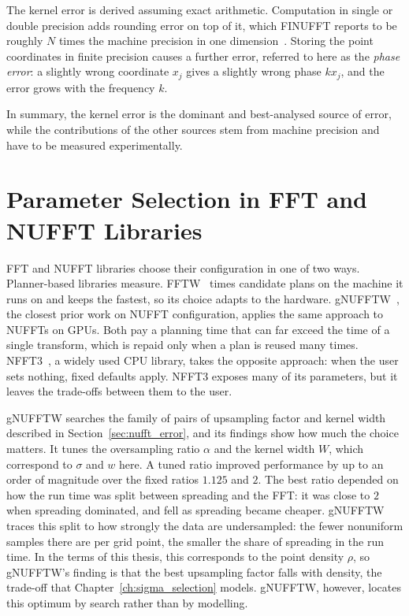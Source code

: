 The kernel error is derived assuming exact arithmetic. Computation in single or
double precision adds rounding error on top of it, which FINUFFT reports to be
roughly $N$ times the machine precision in one
dimension~\cite[Remark~9]{barnett2019}. Storing the point coordinates in
finite precision causes a further error, referred to here as the \emph{phase
error}: a slightly wrong coordinate $x_j$ gives a slightly wrong phase
$k x_j$, and the error grows with the frequency $k$.

In summary, the kernel error is the dominant and best-analysed source of
error, while the contributions of the other sources stem from machine
precision and have to be measured experimentally.

\section{Parameter Selection in FFT and NUFFT Libraries}
\label{sec:related_tuning}

FFT and NUFFT libraries choose their configuration in one of two ways. Planner-based libraries measure. FFTW~\cite{frigo2005} times candidate plans on the machine it runs on and keeps the fastest, so its choice adapts to the hardware. gNUFFTW~\cite{ou2017}, the closest prior work on NUFFT configuration, applies the same approach to NUFFTs on GPUs. Both pay a planning time that can far exceed the time of a single transform, which is repaid only when a plan is reused many times. NFFT3~\cite{keiner2009}, a widely used CPU library, takes the opposite approach: when the user sets nothing, fixed defaults apply. NFFT3 exposes many of its parameters, but it leaves the trade-offs between them to the user.

gNUFFTW searches the family of pairs of upsampling factor and kernel width described in Section~\ref{sec:nufft_error}, and its findings show how much the choice matters. It tunes the oversampling ratio $\alpha$ and the kernel width $W$, which correspond to $\sigma$ and $w$ here. A tuned ratio improved performance by up to an order of magnitude over the fixed ratios $1.125$ and $2$. The best ratio depended on how the run time was split between spreading and the FFT: it was close to $2$ when spreading dominated, and fell as spreading became cheaper. gNUFFTW traces this split to how strongly the data are undersampled: the fewer nonuniform samples there are per grid point, the smaller the share of spreading in the run time. In the terms of this thesis, this corresponds to the point density $\rho$, so gNUFFTW's finding is that the best upsampling factor falls with density, the trade-off that Chapter~\ref{ch:sigma_selection} models. gNUFFTW, however, locates this optimum by search rather than by modelling.

